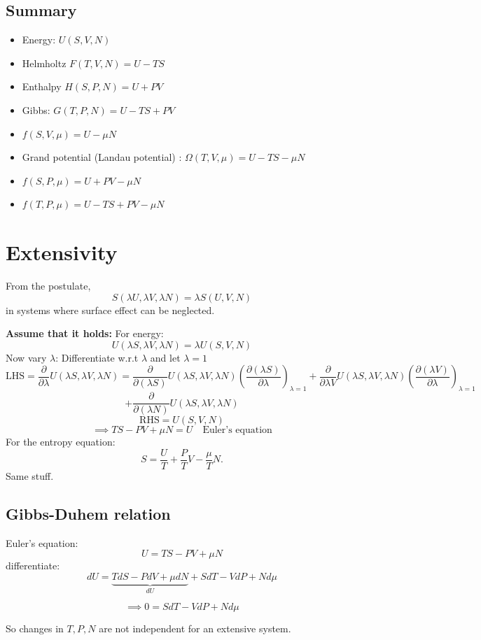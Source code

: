 \documentclass[11pt]{article}
\theoremstyle{definition}
\begin{document}
\subsection{Summary}
\begin{itemize}
	\item Energy: $ U(S,V,N) $ 
	\item Helmholtz $ F(T,V,N) = U - TS $ 
	\item Enthalpy $ H(S,P,N) = U + PV$ 
	\item Gibbs: $ G(T,P,N) = U-TS+PV $ 
	\item $ f(S,V,\mu) = U - \mu N $
	\item Grand potential (Landau potential) : $ \Omega(T,V,\mu) = U-TS-\mu N$
	\item  $ f(S,P,\mu) = U+PV-\mu N$
	\item $ f(T,P,\mu) = U-TS+PV-\mu N $ 
\end{itemize}

\section{Extensivity}
From the postulate,
\[ S(\lambda U, \lambda V, \lambda N) = \lambda S(U,V,N)\] in systems where surface effect can be neglected. 

\textbf{Assume that it holds:} 
For energy:
\[ U(\lambda S, \lambda V, \lambda N) = \lambda U(S,V,N) \] 
Now vary $ \lambda $:
Differentiate w.r.t $ \lambda $ and let $ \lambda =1 $ 
\[ \text{LHS} = \frac{\partial }{\partial \lambda} U(\lambda S, \lambda V, \lambda N) = \frac{\partial }{\partial (\lambda S)} U(\lambda S, \lambda V, \lambda N) \left (\frac{\partial (\lambda S)}{\partial \lambda} \right )_{\lambda = 1} + 
\frac{\partial }{\partial \lambda V} U(\lambda S, \lambda V, \lambda N) \left (\frac{\partial (\lambda V)}{\partial \lambda}\right )_{\lambda =1} \]
\[ + \frac{\partial }{\partial (\lambda N)}U(\lambda S, \lambda V, \lambda N)\] 
\[ \text{RHS} = U(S,V,N) \] 
\begin{equation}
	\implies TS-PV+\mu N = U \quad \text{Euler's equation}
\end{equation}
For the entropy equation:
\[ S = \frac{U}{T} + \frac{P}{T}V - \frac{\mu}{T}N. \] 
Same stuff.

\subsection{Gibbs-Duhem relation}
Euler's equation: \[ U = TS - PV + \mu N \] 
differentiate:
\[ dU = \underbrace{TdS -PdV + \mu dN}_{dU} + SdT - VdP + Nd\mu\] 
\begin{shaded*}
	\begin{equation}
		\implies 0 = SdT - VdP + N d\mu
	\end{equation}	
\end{shaded*}
So changes in $ T, P,N $ are not independent for an extensive system.
\end{document}
